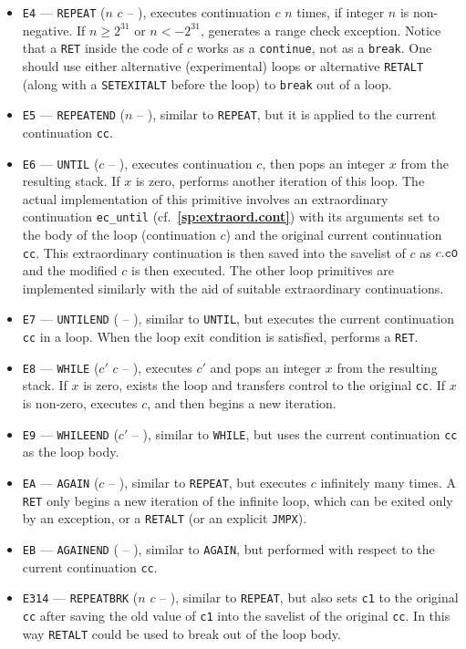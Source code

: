 \documentclass[12pt,oneside]{article}
\def\refpoint#1{{\rm\textbf{\ref{#1}}}}
\let\ptref=\refpoint
\begin{document}
\begin{itemize}
\item {\tt E4} --- {\tt REPEAT} ($n$ $c$ -- ), executes continuation $c$ $n$ times, if integer $n$ is non-negative. If $n\geq2^{31}$ or $n<-2^{31}$, generates a range check exception. Notice that a {\tt RET} inside the code of $c$ works as a {\tt continue}, not as a {\tt break}. One should use either alternative (experimental) loops or alternative {\tt RETALT} (along with a {\tt SETEXITALT} before the loop) to {\tt break} out of a loop.
\item {\tt E5} --- {\tt REPEATEND} ($n$ -- ), similar to {\tt REPEAT}, but it is applied to the current continuation {\tt cc}. 
\item {\tt E6} --- {\tt UNTIL} ($c$ -- ), executes continuation $c$, then pops an integer $x$ from the resulting stack. If $x$ is zero, performs another iteration of this loop. The actual implementation of this primitive involves an extraordinary continuation {\tt ec\_until} (cf.~\ptref{sp:extraord.cont}) with its arguments set to the body of the loop (continuation $c$) and the original current continuation {\tt cc}. This extraordinary continuation is then saved into the savelist of $c$ as $c.{\tt c0}$ and the modified $c$ is then executed. The other loop primitives are implemented similarly with the aid of suitable extraordinary continuations.
\item {\tt E7} --- {\tt UNTILEND} ( -- ), similar to {\tt UNTIL}, but executes the current continuation {\tt cc} in a loop. When the loop exit condition is satisfied, performs a {\tt RET}.
\item {\tt E8} --- {\tt WHILE} ($c'$ $c$ -- ), executes $c'$ and pops an integer $x$ from the resulting stack. If $x$ is zero, exists the loop and transfers control to the original {\tt cc}. If $x$ is non-zero, executes $c$, and then begins a new iteration.
\item {\tt E9} --- {\tt WHILEEND} ($c'$ -- ), similar to {\tt WHILE}, but uses the current continuation {\tt cc} as the loop body.
\item {\tt EA} --- {\tt AGAIN} ($c$ -- ), similar to {\tt REPEAT}, but executes $c$ infinitely many times. A {\tt RET} only begins a new iteration of the infinite loop, which can be exited only by an exception, or a {\tt RETALT} (or an explicit {\tt JMPX}).
\item {\tt EB} --- {\tt AGAINEND} ( -- ), similar to {\tt AGAIN}, but performed with respect to the current continuation {\tt cc}.
\item {\tt E314} --- {\tt REPEATBRK} ($n$ $c$ -- ), similar to {\tt REPEAT}, but also sets {\tt c1} to the original {\tt cc} after saving the old value of {\tt c1} into the savelist of the original {\tt cc}. In this way {\tt RETALT} could be used to break out of the loop body.

\end{itemize}
\end{document}
